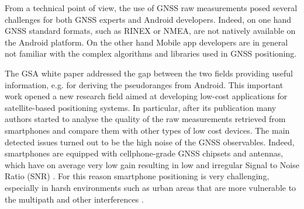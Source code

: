 From a technical point of view, the use of GNSS raw measurements posed several challenges for both GNSS experts and Android developers.
Indeed, on one hand GNSS standard formats, such as RINEX or NMEA, are not natively available on the Android platform. On the other hand Mobile app developers are in general not familiar with the complex algorithms and libraries used in GNSS positioning.

The GSA white paper \cite{GSA_wp:2016} addressed the gap between the two fields providing useful information, e.g. for deriving the pseudoranges from Android. 
This important work opened a new research field aimed at developing low-cost applications for satellite-based positioning systems. 
In particular, after its publication many authors started to analyse the quality of the raw measurements retrieved from smartphones and compare them with other types of low cost devices. The main detected issues turned out to be the high noise of the GNSS observables. Indeed, smartphones are equipped with cellphone-grade GNSS chipsets and antennas, which have on average very low gain resulting in low and irregular Signal to Noise Ratio (SNR) \cite{Zangenehnejad:2021}. For this reason smartphone positioning is very challenging, especially in harsh environments such as urban areas that are more vulnerable to the multipath and other interferences \cite{Angrisano:2022}.

